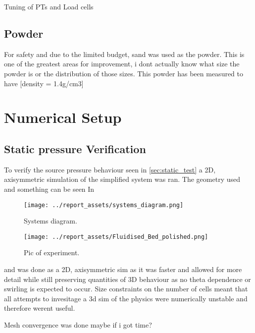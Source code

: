 Tuning of PTs and Load cells
\subsection{Powder}
For safety and due to the limited budget, sand was used as the powder. This is one of the greatest areas for improvement, i dont actually know what size the powder is or the distribution of those sizes. This powder has been measured to have [density = 1.4g/cm3]

\newpage
\section{Numerical Setup}
\subsection{Static pressure Verification}
To verify the source pressure behaviour seen in \autoref{sec:static_test} a 2D, axisymmetric simulation of the simplified system was ran. The geometry used and something can be seen In
\begin{figure}[htbp]
    \centering

    \begin{minipage}{0.95\textwidth}
        \centering
        \texttt{[image: ../report\_assets/systems\_diagram.png]}
        \caption{Systems diagram.}\label{fig:geometry_static_sim}
    \end{minipage}
    \hfill
    \begin{minipage}{0.45\textwidth}
        \centering
        \texttt{[image: ../report\_assets/Fluidised\_Bed\_polished.png]}
        \caption{Pic of experiment.}\label{fig:something_else}
    \end{minipage}

\end{figure}
and was done as a 2D, axisymmetric sim as it was faster and allowed for more detail while still preserving quantities of 3D behaviour as no theta dependence or swirling is expected to occur. Size constraints on the number of cells meant that all attempts to invesitage a 3d sim of the physics were numerically unstable and therefore werent useful.

Mesh convergence was done maybe if i got time?

